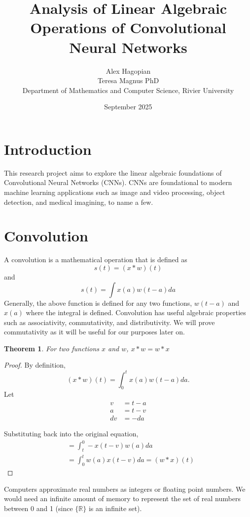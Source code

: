 \documentclass[12pt]{article}
\title{Analysis of Linear Algebraic Operations of Convolutional Neural Networks}
\author{Alex Hagopian \\Teresa Magnus PhD \\ Department of Mathematics and Computer Science, Rivier University}
\date{September 2025}
\newtheorem{theorem}{Theorem}
\begin{document}
\maketitle

\begin{abstract}

\end{abstract}
\section*{Introduction}
This research project aims to explore the linear algebraic 
foundations of Convolutional Neural Networks (CNNs). CNNs are foundational 
to modern machine learning applications such as image and video processing,
object detection, and medical imagining, to name a few.

\section*{Convolution}
A convolution is a mathematical operation that is defined as
\begin{equation}
    s(t) = (x \ast w)(t)
\end{equation}
and
\begin{equation}
    s(t)=\int x(a) w(t-a) da
\end{equation}
Generally, the above function is defined for any two functions, $w(t-a)$ and $x(a)$ where the integral is defined. \cite{Goodfellow-et-al-2016}
Convolution has useful algebraic properties such as associativity, commutativity, and distributivity. We will prove commutativity as it will be useful for our purposes later on.

\begin{theorem}
    For two functions $x$ and $w$, $x \ast w= w \ast x$
\end{theorem}
\begin{proof}
 By definition, 
 \begin{equation*}
     (x * w)(t) = \int_{0}^{t} x(a)w(t-a)da. 
 \end{equation*}
 Let 
 \begin{align*}
     v &= t-a \\
     a &= t-v \\
     dv &= -da
 \end{align*}
     
 Substituting back into the original equation,
 \begin{align*}
     & =\int_{t}^0-x(t-v)w(a)da \\
     & =\int_0^tw(a)x(t-v)da = (w*x)(t)
 \end{align*}
\end{proof}
Computers approximate real numbers as integers or floating point numbers. We would need an infinite amount of memory to represent the set of real numbers between 0 and 1 (since $\{\mathbb{R}\}$ is an infinite set).


 

\end{document}
